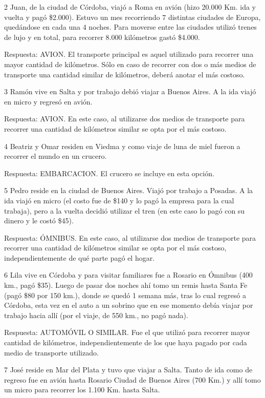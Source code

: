 \documentclass[
  openany]{book}
\begin{document}
2 Juan, de la ciudad de Córdoba, viajó a Roma en avión (hizo 20.000 Km. ida y vuelta y pagó \$2.000). Estuvo un mes recorriendo 7 distintas ciudades de Europa, quedándose en cada una 4 noches. Para moverse entre las ciudades utilizó trenes de lujo y en total, para recorrer 8.000 kilómetros gastó \$4.000.

Respuesta: AVION. El transporte principal es aquel utilizado para recorrer una mayor cantidad de kilómetros. Sólo en caso de recorrer con dos o más medios de transporte una cantidad similar de kilómetros, deberá anotar el más costoso.

3 Ramón vive en Salta y por trabajo debió viajar a Buenos Aires. A la ida viajó en micro y regresó en avión.

Respuesta: AVION. En este caso, al utilizarse dos medios de transporte para recorrer una cantidad de kilómetros similar se opta por el más costoso.

4 Beatriz y Omar residen en Viedma y como viaje de luna de miel fueron a recorrer el mundo en un crucero.

Respuesta: EMBARCACION. El crucero se incluye en esta opción.

5 Pedro reside en la ciudad de Buenos Aires. Viajó por trabajo a Posadas. A la ida viajó en micro (el costo fue de \$140 y lo pagó la empresa para la cual trabaja), pero a la vuelta decidió utilizar el tren (en este caso lo pagó con su dinero y le costó \$45).

Respuesta: ÓMNIBUS. En este caso, al utilizarse dos medios de transporte para recorrer una cantidad de kilómetros similar se opta por el más costoso, independientemente de qué parte pagó el hogar.

6 Lila vive en Córdoba y para visitar familiares fue a Rosario en Ómnibus (400 km., pagó \$35). Luego de pasar dos noches ahí tomo un remis hasta Santa Fe (pagó \$80 por 150 km.), donde se quedó 1 semana más, tras lo cual regresó a Córdoba, esta vez en el auto a un sobrino que en ese momento debía viajar por trabajo hacia allí (por el viaje, de 550 km., no pagó nada).

Respuesta: AUTOMÓVIL O SIMILAR. Fue el que utilizó para recorrer mayor cantidad de kilómetros, independientemente de los que haya pagado por cada medio de transporte utilizado.

7 José reside en Mar del Plata y tuvo que viajar a Salta. Tanto de ida como de regreso fue en avión hasta Rosario Ciudad de Buenos Aires (700 Km.) y allí tomo un micro para recorrer los 1.100 Km. hasta Salta.
\end{document}
